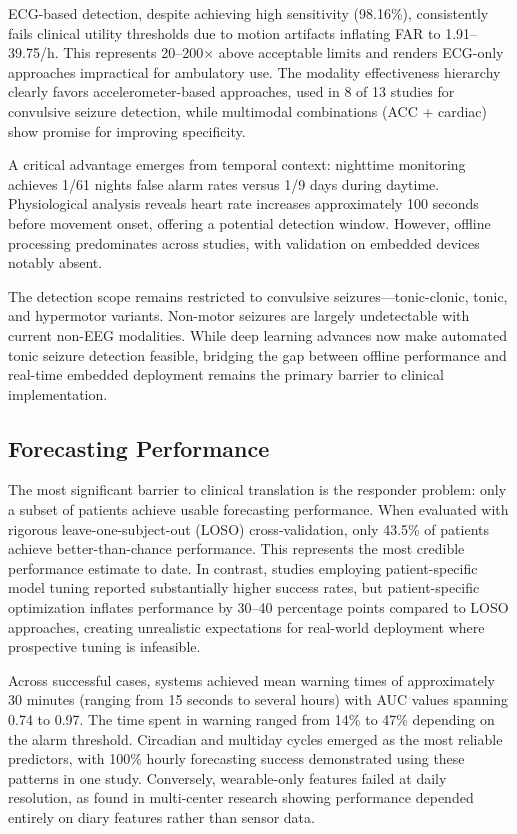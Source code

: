 ECG-based detection, despite achieving high sensitivity (98.16\%), consistently fails clinical utility thresholds due to motion artifacts inflating FAR to 1.91--39.75/h. This represents 20--200$\times$ above acceptable limits and renders ECG-only approaches impractical for ambulatory use. The modality effectiveness hierarchy clearly favors accelerometer-based approaches, used in 8 of 13 studies for convulsive seizure detection, while multimodal combinations (ACC + cardiac) show promise for improving specificity.

A critical advantage emerges from temporal context: nighttime monitoring achieves 1/61 nights false alarm rates versus 1/9 days during daytime. Physiological analysis reveals heart rate increases approximately 100 seconds before movement onset, offering a potential detection window. However, offline processing predominates across studies, with validation on embedded devices notably absent.

The detection scope remains restricted to convulsive seizures---tonic-clonic, tonic, and hypermotor variants. Non-motor seizures are largely undetectable with current non-EEG modalities. While deep learning advances now make automated tonic seizure detection feasible, bridging the gap between offline performance and real-time embedded deployment remains the primary barrier to clinical implementation.

\subsection{Forecasting Performance}

The most significant barrier to clinical translation is the responder problem: only a subset of patients achieve usable forecasting performance. When evaluated with rigorous leave-one-subject-out (LOSO) cross-validation, only 43.5\% of patients achieve better-than-chance performance. This represents the most credible performance estimate to date. In contrast, studies employing patient-specific model tuning reported substantially higher success rates, but patient-specific optimization inflates performance by 30--40 percentage points compared to LOSO approaches, creating unrealistic expectations for real-world deployment where prospective tuning is infeasible.

Across successful cases, systems achieved mean warning times of approximately 30 minutes (ranging from 15 seconds to several hours) with AUC values spanning 0.74 to 0.97. The time spent in warning ranged from 14\% to 47\% depending on the alarm threshold. Circadian and multiday cycles emerged as the most reliable predictors, with 100\% hourly forecasting success demonstrated using these patterns in one study. Conversely, wearable-only features failed at daily resolution, as found in multi-center research showing performance depended entirely on diary features rather than sensor data.


